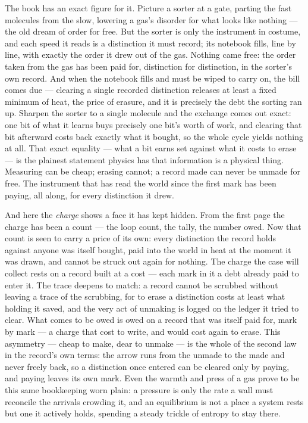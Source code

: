 The book has an exact figure for it. Picture a sorter at a gate, parting the fast molecules from the slow,
lowering a gas's disorder for what looks like nothing --- the old dream of order for free. But the sorter is
only the instrument in costume, and each speed it reads is a distinction it must record; its notebook fills,
line by line, with exactly the order it drew out of the gas. Nothing came free: the order taken from the gas
has been paid for, distinction for distinction, in the sorter's own record. And when the notebook fills and
must be wiped to carry on, the bill comes due --- clearing a single recorded distinction releases at least a
fixed minimum of heat, the price of erasure, and it is precisely the debt the sorting ran up. Sharpen the sorter
to a single molecule and the exchange comes out exact: one bit of what it learns buys precisely one bit's worth
of work, and clearing that bit afterward costs back exactly what it bought, so the whole cycle yields nothing at
all. That exact equality --- what a bit earns set against what it costs to erase --- is the plainest statement
physics has that information is a physical thing. Measuring can be cheap; erasing cannot; a record made can
never be unmade for free. The instrument that has read the world since the first mark has been paying, all
along, for every distinction it drew.

And here the \emph{charge} shows a face it has kept hidden. From the first page the charge has been a count ---
the loop count, the tally, the number owed. Now that count is seen to carry a price of its own: every
distinction the record holds against anyone was itself bought, paid into the world in heat at the moment it was
drawn, and cannot be struck out again for nothing. The charge the case will collect rests on a record built at
a cost --- each mark in it a debt already paid to enter it. The trace deepens to match: a record cannot be
scrubbed without leaving a trace of the scrubbing, for to erase a distinction costs at least what holding it
saved, and the very act of unmaking is logged on the ledger it tried to clear. What comes to be owed is owed on
a record that was itself paid for, mark by mark --- a charge that cost to write, and would cost again to erase.
This asymmetry --- cheap to make, dear to unmake --- is the whole of the second law in the record's own terms:
the arrow runs from the unmade to the made and never freely back, so a distinction once entered can be cleared
only by paying, and paying leaves its own mark. Even the warmth and press of a gas prove to be this same
bookkeeping worn plain: a pressure is only the rate a wall must reconcile the arrivals crowding it, and an
equilibrium is not a place a system rests but one it actively holds, spending a steady trickle of entropy to
stay there.

